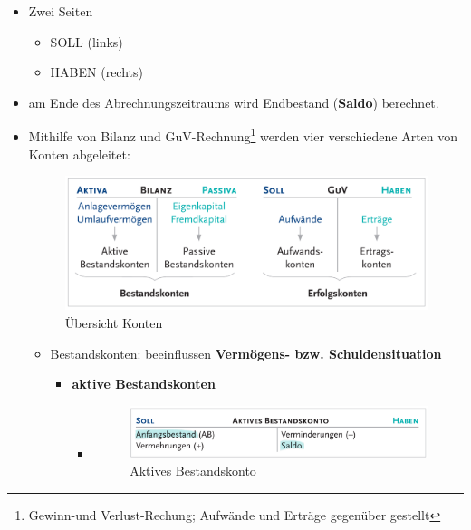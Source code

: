 \documentclass[a4paper, ngerman]{article}
\begin{document}
\begin{itemize}
    \item Zwei Seiten
          \begin{itemize}
              \item SOLL (links)
              \item HABEN (rechts)
          \end{itemize}
    \item am Ende des Abrechnungszeitraums wird Endbestand (\textbf{Saldo}) berechnet.
    \item Mithilfe von Bilanz und GuV-Rechnung\footnote{Gewinn-und Verlust-Rechung; Aufwände und Erträge gegenüber gestellt} werden vier verschiedene Arten von Konten abgeleitet:
          \begin{figure}[h]
              \centering
              \includegraphics[scale=0.2]{pics/uebersicht_konten.png}
              \caption{Übersicht Konten}
          \end{figure}
          \begin{itemize}
              \item Bestandskonten: beeinflussen \textbf{Vermögens- bzw. Schuldensituation}
                    \begin{itemize}
                        \item \textbf{aktive Bestandskonten}
                              \begin{itemize}
                                  \item \begin{figure}[h]
                                            \centering
                                            \includegraphics[scale=0.18]{pics/aktiv_bestandkonto.png}
                                            \caption{Aktives Bestandskonto}

\end{figure}
\end{itemize}
\end{itemize}
\end{itemize}
\end{itemize}
\end{document}
